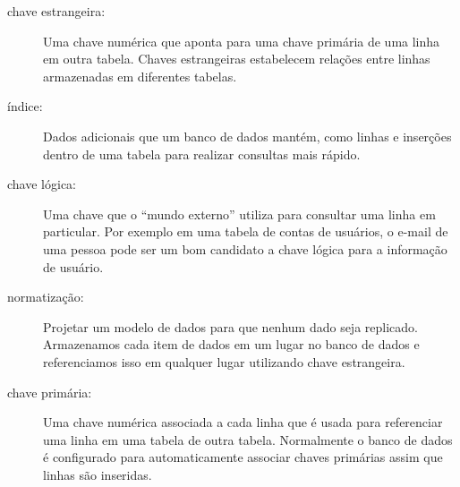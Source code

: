\begin{description}
\item[chave estrangeira:] Uma chave numérica que aponta para uma chave primária
  de uma linha em outra tabela. Chaves estrangeiras estabelecem relações entre
  linhas armazenadas em diferentes tabelas.
  

\item[índice:] Dados adicionais que um banco de dados mantém, como linhas e
  inserções dentro de uma tabela para realizar consultas mais rápido.
  

\item[chave lógica:] Uma chave que o ``mundo externo'' utiliza para consultar
  uma linha em particular. Por exemplo em uma tabela de contas de usuários, o
  e-mail de uma pessoa pode ser um bom candidato a chave lógica para a
  informação de usuário.
  

\item[normatização:] Projetar um modelo de dados para que nenhum dado seja
  replicado. Armazenamos cada item de dados em um lugar no banco de dados
  e referenciamos isso em qualquer lugar utilizando chave estrangeira.
  

\item[chave primária:] Uma chave numérica associada a cada linha que é usada
  para referenciar uma linha em uma tabela de outra tabela. Normalmente o
  banco de dados é configurado para automaticamente associar chaves primárias
  assim que linhas são inseridas.
  

\end{description}
